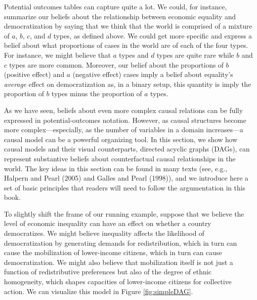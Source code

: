 \documentclass[12pt,]{book}
\begin{document}
Potential outcomes tables can capture quite a lot. We could, for instance, summarize our beliefs about the relationship between economic equality and democratization by saying that we think that the world is comprised of a mixture of \(a\), \(b\), \(c\), and \(d\) types, as defined above. We could get more specific and express a belief about what proportions of cases in the world are of each of the four types. For instance, we might believe that \(a\) types and \(d\) types are quite rare while \(b\) and \(c\) types are more common. Moreover, our belief about the proportions of \(b\) (positive effect) and \(a\) (negative effect) cases imply a belief about equality's \emph{average} effect on democratization as, in a binary setup, this quantity is imply the proportion of \(b\) types minus the proportion of \(a\) types.

As we have seen, beliefs about even more complex causal relations can be fully expressed in potential-outcomes notation. However, as causal structures become more complex---especially, as the number of variables in a domain increases---a causal model can be a powerful organizing tool. In this section, we show how causal models and their visual counterparts, directed acyclic graphs (DAGs), can represent substantive beliefs about counterfactual causal relationships in the world. The key ideas in this section can be found in many texts (see, e.g., Halpern and Pearl (2005) and Galles and Pearl (1998)), and we introduce here a set of basic principles that readers will need to follow the argumentation in this book.

To slightly shift the frame of our running example, suppose that we believe the level of economic inequality can have an effect on whether a country democratizes. We might believe inequality affects the likelihood of democratization by generating demands for redistribution, which in turn can cause the mobilization of lower-income citizens, which in turn can cause democratization. We might also believe that mobilization itself is not just a function of redistributive preferences but also of the degree of ethnic homogeneity, which shapes capacities of lower-income citizens for collective action. We can visualize this model in Figure \ref{fig:simpleDAG}.
\end{document}
